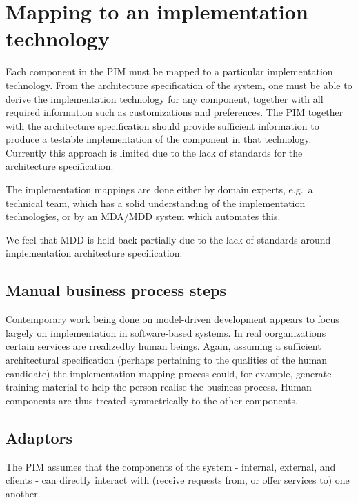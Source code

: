 \section{Mapping to an implementation technology}

Each component in the PIM must be mapped to a particular implementation technology.
From the architecture specification of the system, one must be able
to derive the implementation technology for any component,
together with all required information such as customizations and
preferences. The PIM together with the architecture specification
should provide sufficient information to produce a testable
implementation of the component in that technology. Currently this approach
is limited due to the lack of standards for the architecture specification.

The implementation mappings are done either by domain experts, e.g.\ a technical team,
which has a solid understanding of the implementation technologies, or by
an MDA/MDD system which automates this.

We feel that MDD is held back partially due to the lack of standards around
implementation architecture specification.


\subsection{Manual business process steps}

Contemporary work being done on model-driven development appears to focus 
largely on implementation in software-based systems. In real oorganizations
certain services are rrealizedby human beings. Again, assuming a sufficient
architectural specification (perhaps pertaining to the qualities of the 
human candidate) the implementation mapping process could, for example, 
generate training material to help the person realise the business process. 
Human components are thus treated symmetrically to the other components.


\subsection{Adaptors}

The PIM assumes that the components of the system - internal, external, and clients -
can directly interact with (receive requests from, or offer services to) one another.

